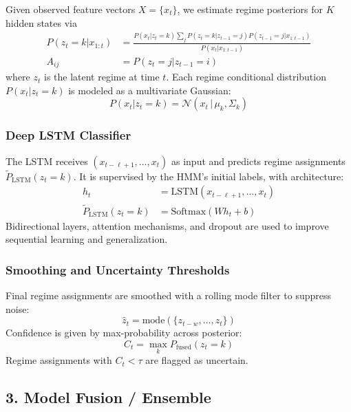 Given observed feature vectors $X = \{x_t\}$, we estimate regime posteriors for $K$ hidden states via
\begin{align}
P(z_t = k | x_{1:t}) &= \frac{P(x_t | z_t = k) \sum_j P(z_t = k | z_{t-1} = j) P(z_{t-1}=j | x_{1:t-1})}{P(x_t | x_{1:t-1})} \\
A_{ij} &= P(z_t = j | z_{t-1} = i) \nonumber
\end{align}
where $z_t$ is the latent regime at time $t$. Each regime conditional distribution $P(x_t | z_t = k)$ is modeled as a multivariate Gaussian:
\begin{equation}
P(x_t | z_t = k) = \mathcal{N}(x_t\,|\, \mu_k, \Sigma_k)
\end{equation}

\subsubsection*{Deep LSTM Classifier}

The LSTM receives $(x_{t-\ell+1}, \ldots, x_t)$ as input and predicts regime assignments $\tilde{P}_{\mathrm{LSTM}}(z_t = k)$. It is supervised by the HMM’s initial labels, with architecture:
\begin{align}
h_t &= \mathrm{LSTM}(x_{t-\ell+1}, ..., x_t) \\
\tilde{P}_{\mathrm{LSTM}}(z_t = k) &= \mathrm{Softmax}(W h_t + b)
\end{align}
Bidirectional layers, attention mechanisms, and dropout are used to improve sequential learning and generalization.

\subsubsection*{Smoothing and Uncertainty Thresholds}

Final regime assignments are smoothed with a rolling mode filter to suppress noise:
\begin{equation}
\hat{z}_t = \mathrm{mode} ( \{ z_{t-w}, \ldots, z_t \} )
\end{equation}
Confidence is given by max-probability across posterior:
\begin{equation}
C_t = \max_k P_{\mathrm{fused}}(z_t = k)
\end{equation}
Regime assignments with $C_t < \tau$ are flagged as uncertain.

\subsection{3. Model Fusion / Ensemble}

